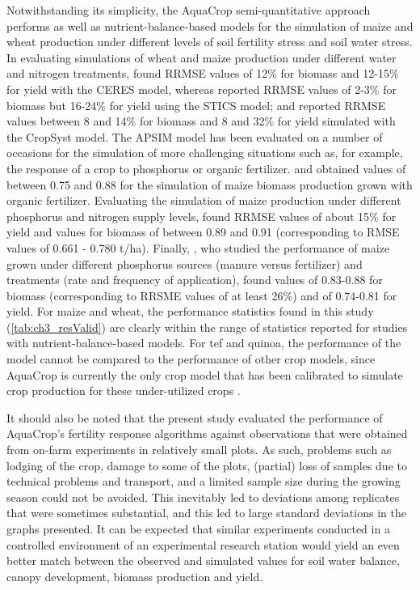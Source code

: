 Notwithstanding its simplicity, the AquaCrop semi-quantitative approach performs as well as nutrient-balance-based models for the simulation of maize and wheat production under different levels of soil fertility stress and soil water stress. In evaluating simulations of wheat and maize production under different water and nitrogen treatments, \textcite{fang2008} found RRMSE values of 12\% for biomass and 12-15\% for yield with the CERES model, whereas \textcite{brisson2002} reported RRMSE values of 2-3\% for biomass but 16-24\% for yield using the STICS model; and \textcite{stockle2003} reported RRMSE values between 8 and 14\% for biomass and 8 and 32\% for yield simulated with the CropSyst model. The APSIM model has been evaluated on a number of occasions for the simulation of more challenging situations such as, for example, the response of a crop to phosphorus or organic fertilizer. \textcite{micheni2004} and \textcite{kinyangi2004} obtained \Rsq values of between 0.75 and 0.88 for the simulation of maize biomass production grown with organic fertilizer. Evaluating the simulation of maize production under different phosphorus and nitrogen supply levels, \textcite{fosumensah2012} found RRMSE values of about 15\% for yield and \Rsq values for biomass of between 0.89 and 0.91 (corresponding to RMSE values of 0.661 - 0.780 t/ha). Finally, \textcite{delve2009}, who studied the performance of maize grown under different phosphorus sources (manure versus fertilizer) and treatments (rate and frequency of application), found \Rsq values of 0.83-0.88 for biomass (corresponding to RRSME values of at least 26\%) and of 0.74-0.81 for yield. For maize and wheat, the performance statistics found in this study (\autoref{tab:ch3_resValid}) are clearly within the range of statistics reported for studies with nutrient-balance-based models. For tef and quinoa, the performance of the model cannot be compared to the performance of other crop models, since AquaCrop is currently the only crop model that has been calibrated to simulate crop production for these under-utilized crops \parencite{geerts2009, tsegay2012}.

It should also be noted that the present study evaluated the performance of AquaCrop’s fertility response algorithms against observations that were obtained from on-farm experiments in relatively small plots. As such, problems such as lodging of the crop, damage to some of the plots, (partial) loss of samples due to technical problems and transport, and a limited sample size during the growing season could not be avoided. This inevitably led to deviations among replicates that were sometimes substantial, and this led to large standard deviations in the graphs presented. It can be expected that similar experiments conducted in a controlled environment of an experimental research station would yield an even better match between the observed and simulated values for soil water balance, canopy development, biomass production and yield.

